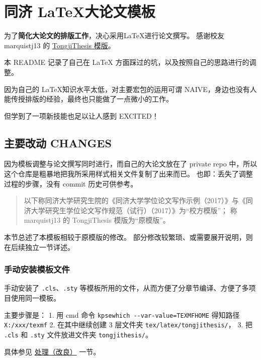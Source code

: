 \documentclass[../Main/thesis.tex]{subfiles}
\begin{document}
\chapter{同济 \LaTeX 大论文模板}

为了\textbf{简化大论文的排版工作}，决心采用LaTeX进行论文撰写。 感谢校友
marquistj13 的
\href{https://github.com/marquistj13/TongjiThesis}{TongjiThesis 模版}。

本 README 记录了自己在 \LaTeX{} 方面踩过的坑，以及按照自己的思路进行的调整。

因为自己的 \LaTeX 知识水平太低，对主要宏包的运用可谓
NAIVE，身边也没有人能传授排版的经验，最终也只能做了一点微小的工作。

但学到了一项新技能也足以让人感到 EXCITED！

\section{主要改动 CHANGES}
\label{ux4e3bux8981ux6539ux52a8-changes}

因为模板调整与论文撰写同时进行，而自己的大论文放在了 private repo
中，所以这个仓库是粗暴地把我所采用样式相关文件复制了出来而已。
也即：丢失了调整过程的步骤，没有 commit 历史可供参考。

\begin{quote}
以下称同济大学研究生院的《同济大学学位论文写作示例（2017）》与《同济大学研究生学位论文写作规范（试行）（2017）》为``校方模版''；
称 marquistj13 的 TongjiThesis 模版为``原模版''。
\end{quote}

本节总述了本模板相较于原模版的修改。
部分修改较繁琐、或需要展开说明，则在后续独立一节详述。

\subsection{手动安装模板文件}

手动安装了 \texttt{.cls}、\texttt{.sty}
等模板所用的文件，从而方便了分章节编译、方便了多项目使用同一模板。

主要步骤是： 1. 用 cmd 命令 \texttt{kpsewhich\ -\/-var-value=TEXMFHOME}
得知路径 \texttt{X:/xxx/texmf} 2. 在其中继续创建 3 层文件夹
\texttt{tex/latex/tongjithesis/}， 3. 把 \texttt{.cls} 和 \texttt{.sty}
文件放进文件夹 \texttt{tongjithesis/}。

具体参见
\protect\hyperlink{ux5cux25e5ux5cux25a4ux5cux2584ux5cux25e7ux5cux2590ux5cux2586ux5cux25e6ux5cux2594ux5cux25b9ux5cux25e8ux5cux2589ux5cux25af}{处理（改良）}
一节。
\end{document}

